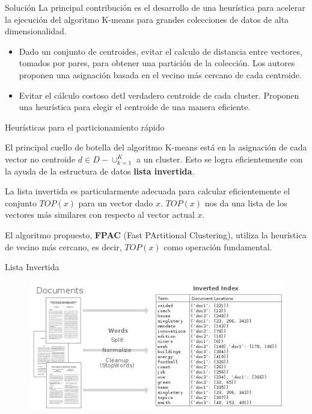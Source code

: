 \begin{frame}{Solución}
La principal contribución es el desarrollo de una
heurística para acelerar la ejecución del
algoritmo K-means para grandes colecciones de datos
de alta dimensionalidad.

\begin{itemize}
\item Dado un conjunto de centroides, evitar el calculo
de distancia entre vectores, tomados por pares, para obtener una 
partición de la colección. Los autores proponen una asignación basada en el vecino más cercano de cada centroide.

\item Evitar el cálculo costoso detl verdadero centroide de 
cada cluster. Proponen una heurística para elegir el centroide
de una manera eficiente.
\end{itemize} 
\end{frame}

\begin{frame}{Heurísticas para el particionamiento rápido}

El principal cuello de botella del algoritmo K-means está
en la asignación de cada vector no centroide $d\in D - \cup_{k=1}^K$
a un cluster. Esto se logra eficientemente con la ayuda de la estructura
de datos \textbf{lista invertida}.

La lista invertida es particularmente adecuada para calcular
eficientemente el conjunto $TOP(x)$ para un vector dado $x$.
$TOP(x)$ nos da una lista de los vectores más similares
con respecto al vector actual $x$.

El algoritmo propuesto, \textbf{FPAC} (Fast PArtitional
Clustering), utiliza la heurística de vecino más cercano, es decir,
$TOP(x)$ como operación fundamental.

\end{frame}


\begin{frame}{Lista Invertida}
\begin{figure}
\includegraphics[scale=0.5]{img/invertedIndex}
\end{figure}
\end{frame}


